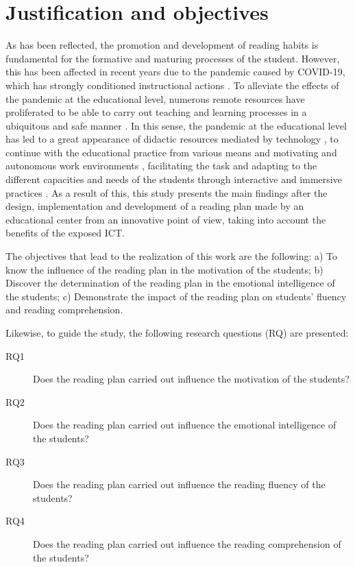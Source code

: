 \documentclass[english]{textolivre}
\begin{document}
\section{Justification and objectives}
As has been reflected, the promotion and development of reading habits is fundamental for the formative and maturing processes of the student. However, this has been affected in recent years due to the pandemic caused by COVID-19, which has strongly conditioned instructional actions \cite{corell-almuzara_covid-19_2021}. To alleviate the effects of the pandemic at the educational level, numerous remote resources have proliferated to be able to carry out teaching and learning processes in a ubiquitous and safe manner \cite{lopez-belmonte_co-word_2021}. In this sense, the pandemic at the educational level has led to a great appearance of didactic resources mediated by technology \cite{moreno-guerrero_flipped_2021}, to continue with the educational practice from various means and motivating and autonomous work environments \cite{marin-marin_steam_2021}, facilitating the task and adapting to the different capacities and needs of the students \cite{carmona-serrano_evolution_2021} through interactive and immersive practices \cite{lopez-belmonte_impact_2022}. As a result of this, this study presents the main findings after the design, implementation and development of a reading plan made by an educational center from an innovative point of view, taking into account the benefits of the exposed ICT.

The objectives that lead to the realization of this work are the following: a) To know the influence of the reading plan in the motivation of the students; b) Discover the determination of the reading plan in the emotional intelligence of the students; c) Demonstrate the impact of the reading plan on students' fluency and reading comprehension.

Likewise, to guide the study, the following research questions (RQ) are presented:
\begin{description}
\item[RQ1] Does the reading plan carried out influence the motivation of the students? 
\item[RQ2] Does the reading plan carried out influence the emotional intelligence of the students?
\item[RQ3] Does the reading plan carried out influence the reading fluency of the students?
\item[RQ4] Does the reading plan carried out influence the reading comprehension of the students?
\end{description}
\end{document}
